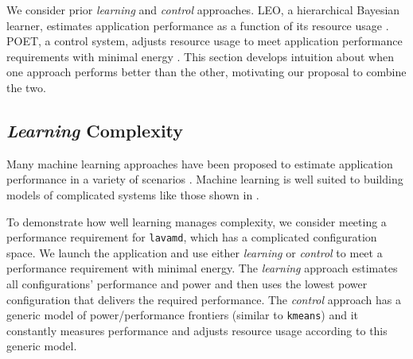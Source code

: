 
We consider prior \emph{learning} and \emph{control} approaches.  LEO,
a hierarchical Bayesian learner, estimates application performance as
a function of its resource usage \cite{LEO}. POET, a control system,
adjusts resource usage to meet application performance requirements
with minimal energy \cite{POET}.  This section develops intuition
about when one approach performs better than the other, motivating our
proposal to combine the two.

\subsection{\emph{Learning} Complexity}
Many machine learning approaches have been proposed to estimate
application performance in a variety of scenarios
\cite{reddiHPCA2013,LeeBrooks2006,CPR,ParallelismDial,Flicker,LeeBrooks,Koala}.
Machine learning is well suited to building models of complicated
systems like those shown in
.

To demonstrate how well learning manages complexity, we consider
meeting a performance requirement for \texttt{lavamd}, which has a
complicated configuration space.  We launch the application and use
either \emph{learning} or \emph{control} to meet a performance
requirement with minimal energy.  The \emph{learning} approach
estimates all configurations' performance and power and then uses the
lowest power configuration that delivers the required performance.
The \emph{control} approach has a generic model of power/performance
frontiers (similar to \texttt{kmeans}) and it constantly measures
performance and adjusts resource usage according to this generic
model.  

